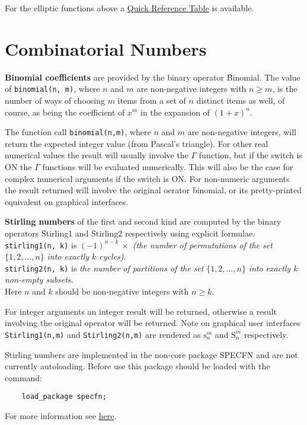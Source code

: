 For the elliptic functions above
a \hyperlink{ELLIPFNTAB}{Quick Reference Table} is available.

\section{Combinatorial Numbers}
  
\textbf{Binomial coefficients} are provided by the binary operator \f{Binomial}.
The value of \texttt{binomial(n, m)}, where $n$ and $m$ are non-negative
integers with $n \geq m$, is the number of ways of choosing $m$ items from a
set of $n$ distinct items as well, of course, as being the coefficient of $x^m$
in the expansion of $(1+x)^n$.

The function call \texttt{binomial(n,m)}, where $n$ and $m$
are non-negative integers, will return the expected integer value
(from Pascal's triangle). For other real numerical values the result will
usually involve the $\Gamma$ function, but if the switch
 is ON the $\Gamma$ functions will be evaluated numerically.
This will also be the case for complex numerical arguments if the switch
 is ON.  For non-numeric arguments the result returned will
involve the original oerator \f{binomial}, or its pretty-printed equivalent
on graphical interfaces.

\hypertarget{operator:Stirling1}{}\hypertarget{operator:Stirling2}{}
\textbf{Stirling numbers} of the first and second kind are computed
by the binary operators \f{Stirling1} and \f{Stirling2}
respectively using explicit formulae.
\texttt{stirling1(n, k)} is $(-1)^{n-k}\ \times$
\emph{(the number of permutations of the set} $\{1, 2, \ldots, n\}$
\emph{into exactly $k$ cycles)}.\\
\texttt{stirling2(n, k)} is \emph{the number of partitions of the set}
$\{1, 2, \ldots, n\}$ \emph{into exactly $k$ non-empty subsets}.\\
Here $n$ and $k$ should be non-negative integers with $n \geq k$.

For integer arguments an integer result will be
returned, otherwise a result involving the original operator will be returned.
Note on graphical user interfaces \texttt{Stirling1(n,m)} and
\texttt{Stirling2(n,m)} are rendered as
$\mathrm{s}_n^m$ and $\mathrm{S}_n^m$ respectively.

Stirling numbers are implemented in the non-core package SPECFN and are
not currently autoloading. Before use this package should be loaded with the
command:
\begin{verbatim}
    load_package specfn;
\end{verbatim}
For more information see \hyperlink{STIRL}{here}.

